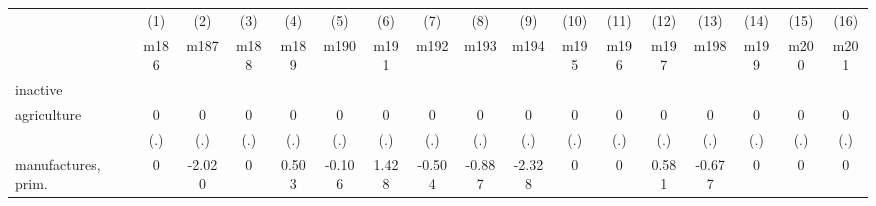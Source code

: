 {
\def\sym#1{\ifmmode^{#1}\else\(^{#1}\)\fi}
\begin{tabular}{l*{16}{c}}
\hline\hline
                    &\multicolumn{1}{c}{(1)}&\multicolumn{1}{c}{(2)}&\multicolumn{1}{c}{(3)}&\multicolumn{1}{c}{(4)}&\multicolumn{1}{c}{(5)}&\multicolumn{1}{c}{(6)}&\multicolumn{1}{c}{(7)}&\multicolumn{1}{c}{(8)}&\multicolumn{1}{c}{(9)}&\multicolumn{1}{c}{(10)}&\multicolumn{1}{c}{(11)}&\multicolumn{1}{c}{(12)}&\multicolumn{1}{c}{(13)}&\multicolumn{1}{c}{(14)}&\multicolumn{1}{c}{(15)}&\multicolumn{1}{c}{(16)}\\
                    &\multicolumn{1}{c}{m186}&\multicolumn{1}{c}{m187}&\multicolumn{1}{c}{m188}&\multicolumn{1}{c}{m189}&\multicolumn{1}{c}{m190}&\multicolumn{1}{c}{m191}&\multicolumn{1}{c}{m192}&\multicolumn{1}{c}{m193}&\multicolumn{1}{c}{m194}&\multicolumn{1}{c}{m195}&\multicolumn{1}{c}{m196}&\multicolumn{1}{c}{m197}&\multicolumn{1}{c}{m198}&\multicolumn{1}{c}{m199}&\multicolumn{1}{c}{m200}&\multicolumn{1}{c}{m201}\\
\hline
inactive            &                     &                     &                     &                     &                     &                     &                     &                     &                     &                     &                     &                     &                     &                     &                     &                     \\
agriculture         &           0         &           0         &           0         &           0         &           0         &           0         &           0         &           0         &           0         &           0         &           0         &           0         &           0         &           0         &           0         &           0         \\
                    &         (.)         &         (.)         &         (.)         &         (.)         &         (.)         &         (.)         &         (.)         &         (.)         &         (.)         &         (.)         &         (.)         &         (.)         &         (.)         &         (.)         &         (.)         &         (.)         \\
[1em]
manufactures, prim. &           0         &      -2.020         &           0         &       0.503         &      -0.106         &       1.428         &      -0.504         &      -0.887         &      -2.328         &           0         &           0         &       0.581         &      -0.677         &           0         &           0         &           0         \\

\end{tabular}}
